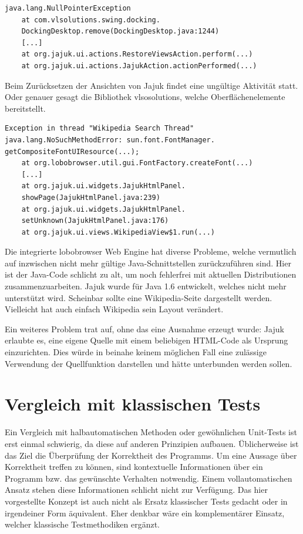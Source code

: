 \begin{lstlisting}[float=!ht,label=fmjson,caption={Ausnahme Jajuk beim Reset der Ansicht}]
java.lang.NullPointerException
	at com.vlsolutions.swing.docking.
	DockingDesktop.remove(DockingDesktop.java:1244)
	[...]
	at org.jajuk.ui.actions.RestoreViewsAction.perform(...)
	at org.jajuk.ui.actions.JajukAction.actionPerformed(...)
\end{lstlisting}
	
Beim Zurücksetzen der Ansichten von Jajuk findet eine ungültige Aktivität statt.
Oder genauer gesagt die Bibliothek vlsosolutions, welche Oberflächenelemente bereitstellt.

\begin{lstlisting}[float=!ht,label=fmjson,caption={Ausnahme Jajuk bei Webansicht}]
Exception in thread "Wikipedia Search Thread" 
java.lang.NoSuchMethodError: sun.font.FontManager.
getCompositeFontUIResource(...);
	at org.lobobrowser.util.gui.FontFactory.createFont(...)
	[...]
	at org.jajuk.ui.widgets.JajukHtmlPanel.
	showPage(JajukHtmlPanel.java:239)
	at org.jajuk.ui.widgets.JajukHtmlPanel.
	setUnknown(JajukHtmlPanel.java:176)
	at org.jajuk.ui.views.WikipediaView$1.run(...)
\end{lstlisting}
	
Die integrierte lobobrowser Web Engine hat diverse Probleme, welche vermutlich
auf inzwischen nicht mehr gültige Java-Schnittstellen zurückzuführen sind.
Hier ist der Java-Code schlicht zu alt, um noch fehlerfrei mit aktuellen Distributionen zusammenzuarbeiten.
Jajuk wurde für Java 1.6 entwickelt, welches nicht mehr unterstützt wird.
Scheinbar sollte eine Wikipedia-Seite dargestellt werden.
Vielleicht hat auch einfach Wikipedia sein Layout verändert.


Ein weiteres Problem trat auf, ohne das eine Ausnahme erzeugt wurde:
Jajuk erlaubte es, eine eigene Quelle mit einem beliebigen HTML-Code
als Ursprung einzurichten. Dies würde in beinahe keinem möglichen
Fall eine zulässige Verwendung der Quellfunktion darstellen und hätte
unterbunden werden sollen.



\section{Vergleich mit klassischen Tests}\label{section:testcomparisonclassic}

Ein Vergleich mit halbautomatischen Methoden oder gewöhnlichen Unit-Tests
ist erst einmal schwierig, da diese auf anderen Prinzipien aufbauen.
Üblicherweise ist das Ziel die Überprüfung der Korrektheit des Programms.
Um eine Aussage über Korrektheit treffen zu können, sind kontextuelle
Informationen über ein Programm bzw. das gewünschte Verhalten notwendig.
Einem vollautomatischen Ansatz stehen diese Informationen schlicht nicht
zur Verfügung. Das hier vorgestellte Konzept ist auch nicht als Ersatz 
klassischer Tests gedacht oder in irgendeiner Form äquivalent.
Eher denkbar wäre ein komplementärer Einsatz, welcher klassische
Testmethodiken ergänzt.

